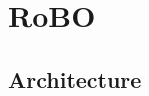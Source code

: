\documentclass[10pt,handout]{beamer}
\begin{document}
%
%
%
%
%
%
%



%
%
%







\section{RoBO}

\subsection{Architecture}
\end{document}
